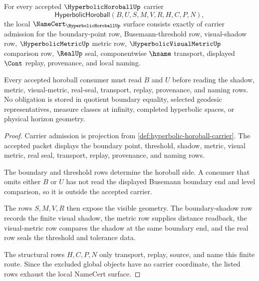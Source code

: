 \begin{theorem}
\label{thm:hyperbolic-horoball-namecert-obligations}
For every accepted $\HyperbolicHoroballUp$ carrier
$$
\mathsf{HyperbolicHoroball}(B,U,S,M,V,R,H,C,P,N),
$$
the local $\NameCert_{\HyperbolicHoroballUp}$ surface consists exactly of carrier admission for the boundary-point row, Busemann-threshold row, visual-shadow row, $\HyperbolicMetricUp$ metric row, $\HyperbolicVisualMetricUp$ comparison row, $\RealUp$ seal, componentwise $\hsame$ transport, displayed $\Cont$ replay, provenance, and local naming.

Every accepted horoball consumer must read $B$ and $U$ before reading the shadow, metric, visual-metric, real-seal, transport, replay, provenance, and naming rows. No obligation is stored in quotient boundary equality, selected geodesic representatives, measure classes at infinity, completed hyperbolic spaces, or physical horizon geometry.
\end{theorem}
\begin{proof}
Carrier admission is projection from \autoref{def:hyperbolic-horoball-carrier}. The accepted packet displays the boundary point, threshold, shadow, metric, visual metric, real seal, transport, replay, provenance, and naming rows.

The boundary and threshold rows determine the horoball side. A consumer that omits either $B$ or $U$ has not read the displayed Busemann boundary end and level comparison, so it is outside the accepted carrier.

The rows $S,M,V,R$ then expose the visible geometry. The boundary-shadow row records the finite visual shadow, the metric row supplies distance readback, the visual-metric row compares the shadow at the same boundary end, and the real row seals the threshold and tolerance data.

The structural rows $H,C,P,N$ only transport, replay, source, and name this finite route. Since the excluded global objects have no carrier coordinate, the listed rows exhaust the local NameCert surface.
\end{proof}

